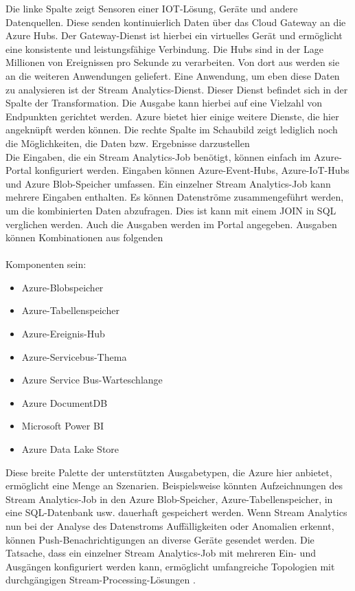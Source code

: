 Die linke Spalte zeigt Sensoren einer IOT-Lösung, Geräte und andere Datenquellen. Diese senden kontinuierlich Daten über das Cloud Gateway an die Azure Hubs. Der Gateway-Dienst ist hierbei ein virtuelles Gerät und ermöglicht eine konsistente und leistungsfähige Verbindung. Die Hubs sind in der Lage Millionen von Ereignissen pro Sekunde zu verarbeiten. Von dort aus werden sie an die weiteren Anwendungen geliefert. Eine Anwendung, um eben diese Daten zu analysieren ist der Stream Analytics-Dienst. Dieser Dienst befindet sich in der Spalte der Transformation. Die Ausgabe kann hierbei auf eine Vielzahl von Endpunkten gerichtet werden. Azure bietet hier einige weitere Dienste, die hier angeknüpft werden können. Die rechte Spalte im Schaubild zeigt lediglich noch die Möglichkeiten, die Daten bzw. Ergebnisse darzustellen \cite{Prosise.} \\
Die Eingaben, die ein Stream Analytics-Job benötigt, können einfach im Azure-Portal konfiguriert werden. Eingaben können Azure-Event-Hubs, Azure-IoT-Hubs und Azure Blob-Speicher umfassen. Ein einzelner Stream Analytics-Job kann mehrere Eingaben enthalten. Es können Datenströme zusammengeführt werden, um die kombinierten Daten abzufragen. Dies ist kann mit einem JOIN in SQL verglichen werden. Auch die Ausgaben werden im Portal angegeben. Ausgaben können Kombinationen aus folgenden\\ \\ Komponenten sein:
\begin{itemize}
\item Azure-Blobspeicher 
\item Azure-Tabellenspeicher 
\item Azure-Ereignis-Hub 
\item Azure-Servicebus-Thema 
\item Azure Service Bus-Warteschlange 
\item Azure DocumentDB 
\item Microsoft Power BI 
\item Azure Data Lake Store \\ 
\end{itemize}
Diese breite Palette der unterstützten Ausgabetypen, die Azure hier anbietet, ermöglicht eine Menge an Szenarien. Beispielsweise könnten Aufzeichnungen des Stream Analytics-Job in den Azure Blob-Speicher, Azure-Tabellenspeicher, in eine SQL-Datenbank usw. dauerhaft gespeichert werden. Wenn Stream Analytics nun bei der Analyse des Datenstroms Auffälligkeiten oder Anomalien erkennt, können Push-Benachrichtigungen an diverse Geräte gesendet werden. Die Tatsache, dass ein einzelner Stream Analytics-Job mit mehreren Ein- und Ausgängen konfiguriert werden kann, ermöglicht umfangreiche Topologien mit durchgängigen Stream-Processing-Lösungen \cite{Prosise.}.
